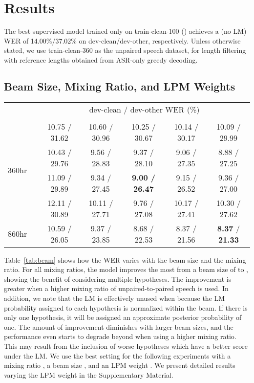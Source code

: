 \section{Results}

The best supervised model trained only on train-clean-100 () achieves a (no LM) WER of 14.00\%/37.02\% on dev-clean/dev-other, respectively.
Unless otherwise stated, we use train-clean-360 as the unpaired speech dataset,  for length filtering with reference lengths obtained from ASR-only greedy decoding.

\subsection{Beam Size, Mixing Ratio, and LPM Weights}

\begin{table*}[ht]
    \small
    \caption{We vary the mixing ratio  and the beam size . An LPM weight  is used.}
    \label{tab:beam}
    \begin{center}
    \begin{tabular}{llccccc}
        \toprule
        \multirow{2}{*}{} & \multirow{2}{*}{} & 
        \multicolumn{5}{c}{dev-clean / dev-other WER (\%)} \\
        & &  &  &  &  &  \\ 
        \midrule
        \multirow{4}{*}{360hr}
        &  & 10.75 / 31.62 & 10.60 / 30.96 & 10.25 / 30.67 & 10.14 / 30.17 & 10.09 / 29.99 \\
        &  & 10.43 / 29.76 &  9.56 / 28.83 &  9.37 / 28.10 &  9.06 / 27.35 &  8.88 / 27.25 \\
        &  & 11.09 / 29.89 &  9.34 / 27.45 &  \textbf{9.00 / 26.47} &  9.15 / 26.52 &  9.36 / 27.00 \\
        &  & 12.11 / 30.89 & 10.11 / 27.71 &  9.76 / 27.08 & 10.17 / 27.41 & 10.30 / 27.62 \\
        \midrule
        860hr &  & 10.59 / 26.05 & 9.37 / 23.85 & 8.68 / 22.53 & 8.37 / 21.56 & \textbf{8.37} / \textbf{21.33} \\
        \bottomrule
    \end{tabular}
    \end{center}
\end{table*}

Table~\ref{tab:beam} shows how the WER varies with the beam size and the mixing ratio. 
For all mixing ratios, the model improves the most from a beam size of  to , showing the benefit of considering multiple hypotheses.
The improvement is greater when a higher mixing ratio of unpaired-to-paired speech is used.
In addition, we note that the LM is effectively unused when  because the LM probability assigned to each hypothesis is normalized within the beam. If there is only one hypothesis, it will be assigned an approximate posterior probability of one.
The amount of improvement diminishes with larger beam sizes, and the performance even starts to degrade beyond  when using a higher mixing ratio.
This may result from the inclusion of worse hypotheses which have a better score under the LM.
We use the best setting for the following experiments with a mixing ratio , a beam size , and an LPM weight .
We present detailed results varying the LPM weight in the Supplementary Material.

